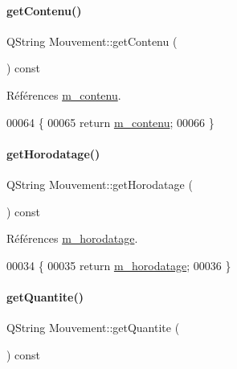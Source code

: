 \paragraph{\texorpdfstring{get\+Contenu()}{getContenu()}}
{\footnotesize\ttfamily Q\+String Mouvement\+::get\+Contenu (\begin{DoxyParamCaption}{ }\end{DoxyParamCaption}) const}



Références \hyperlink{class_mouvement_a631b133243576c36fec6e1912415d7d6}{m\+\_\+contenu}.


\begin{DoxyCode}
00064 \{
00065     \textcolor{keywordflow}{return} \hyperlink{class_mouvement_a631b133243576c36fec6e1912415d7d6}{m\_contenu};
00066 \}
\end{DoxyCode}
\mbox{\label{class_mouvement_ab6990fd5ea6c47ab3fb6a8a4944c2df9}} 
\paragraph{\texorpdfstring{get\+Horodatage()}{getHorodatage()}}
{\footnotesize\ttfamily Q\+String Mouvement\+::get\+Horodatage (\begin{DoxyParamCaption}{ }\end{DoxyParamCaption}) const}



Références \hyperlink{class_mouvement_a24f34a74c17068f6c98635400862adcd}{m\+\_\+horodatage}.


\begin{DoxyCode}
00034 \{
00035     \textcolor{keywordflow}{return} \hyperlink{class_mouvement_a24f34a74c17068f6c98635400862adcd}{m\_horodatage};
00036 \}
\end{DoxyCode}
\mbox{\label{class_mouvement_a427e1320936bfaf09ca0b2c42ae9dd98}} 
\paragraph{\texorpdfstring{get\+Quantite()}{getQuantite()}}
{\footnotesize\ttfamily Q\+String Mouvement\+::get\+Quantite (\begin{DoxyParamCaption}{ }\end{DoxyParamCaption}) const}



